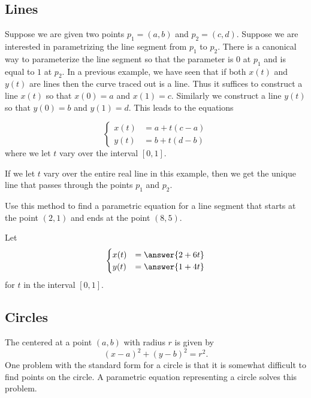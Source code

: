 \documentclass{ximera}
\begin{document}
\subsection{Lines}

Suppose we are given two points $p_{1}=(a,b)$ and $p_{2}=(c, d)$. Suppose we are interested in parametrizing the line segment from $p_{1}$ to $p_{2}$. There is a canonical way to parameterize the line segment so that the parameter is $0$ at $p_{1}$ and is equal to $1$ at $p_{2}$. In a previous example, we have seen that if both $x(t)$ and $y(t)$ are lines then the curve traced out is a line. Thus it suffices to construct a line $x(t)$ so that $x(0)=a$ and $x(1)=c$. Similarly we construct a line $y(t)$ so that $y(0)=b$ and $y(1)=d$. This
 leads to the equations


\[
\begin{cases}
x(t)&=a+t(c-a) \\
y(t)&=b+t(d-b)
\end{cases}
\]
where we let $t$ vary over the interval $[0,1]$.

If we let $t$ vary over the entire real line in this example, then we get the unique line that passes through the points $p_{1}$ and $p_{2}$.

\begin{question}
Use this method to find a parametric equation for a line segment that starts at the point $(2,1)$ and ends at the point $(8, 5)$.

Let
\[
\begin{cases}
x(t)&=\answer{2+6t}\\
y(t)&=\answer{1+4t}
\end{cases}
\]
for $t$ in the interval $[0, 1]$.


\end{question}




\subsection{Circles}

The  centered at a point $(a,b)$ with
radius $r$ is given by
\[
(x-a)^2 + (y-b)^2 = r^2.
\]
One problem with the standard form for a circle is that it is somewhat
difficult to find points on the circle. A parametric equation
representing a circle solves this problem.
\end{document}
